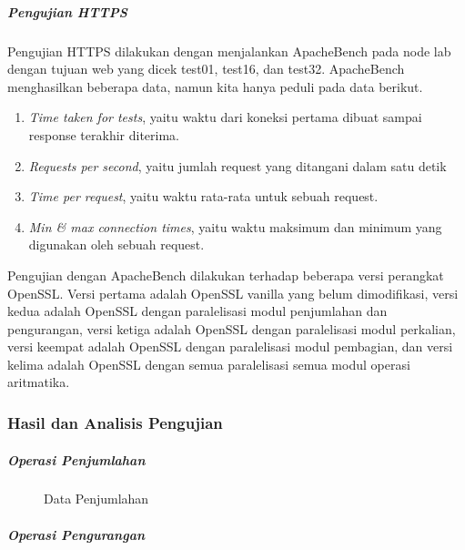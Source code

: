       \subparagraph{Pengujian HTTPS}
      Pengujian HTTPS dilakukan dengan menjalankan ApacheBench pada node lab dengan tujuan web yang dicek test01, test16, dan test32. ApacheBench menghasilkan beberapa data, namun kita hanya peduli pada data berikut.
      \begin{enumerate}[label=\roman*.]
        \item \textit{Time taken for tests}, yaitu waktu dari koneksi pertama dibuat sampai response terakhir diterima.
        \item \textit{Requests per second}, yaitu jumlah request yang ditangani dalam satu detik
        \item \textit{Time per request}, yaitu waktu rata-rata untuk sebuah request.
        \item \textit{Min \& max connection times}, yaitu waktu maksimum dan minimum yang digunakan oleh sebuah request.
      \end{enumerate}

      Pengujian dengan ApacheBench dilakukan terhadap beberapa versi perangkat OpenSSL. Versi pertama adalah OpenSSL vanilla yang belum dimodifikasi, versi kedua adalah OpenSSL dengan paralelisasi modul penjumlahan dan pengurangan, versi ketiga adalah OpenSSL dengan paralelisasi modul perkalian, versi keempat adalah OpenSSL dengan paralelisasi modul pembagian, dan versi kelima adalah OpenSSL dengan semua paralelisasi semua modul operasi aritmatika.

    \subsubsection{Hasil dan Analisis Pengujian}


    \subparagraph{Operasi Penjumlahan}
    \begin{figure}[h]
      \centering
      \caption{Data Penjumlahan}
      \label{fig:data_add}
    \end{figure}
    \subparagraph{Operasi Pengurangan}



